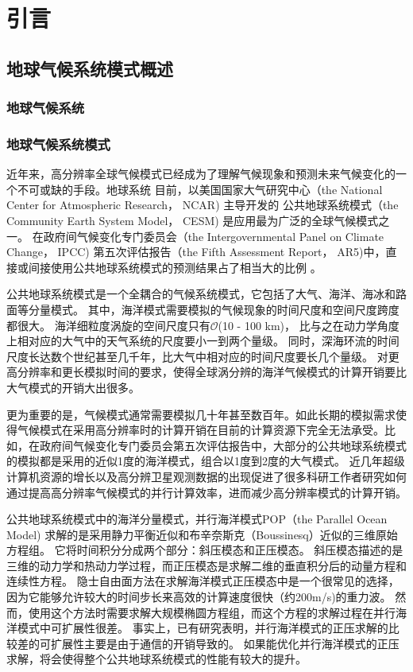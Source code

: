 \chapter{引言}
\label{cha:intro}

\section{地球气候系统模式概述}
\subsection{地球气候系统}
\subsection{地球气候系统模式}


近年来，高分辨率全球气候模式已经成为了理解气候现象和预测未来气候变化的一个不可或缺的手段。地球系统
目前，以美国国家大气研究中心（the National Center for Atmospheric Research， NCAR) 主导开发的
公共地球系统模式（the Community Earth System Model， CESM) 是应用最为广泛的全球气候模式之一。
在政府间气候变化专门委员会（the
Intergovernmental Panel on Climate Change， IPCC) 第五次评估报告（the Fifth Assessment
Report， AR5)中，直接或间接使用公共地球系统模式的预测结果占了相当大的比例 \cite{stocker2013ipcc}。
 

公共地球系统模式是一个全耦合的气候系统模式，它包括了大气、海洋、海冰和路面等分量模式。
其中，海洋模式需要模拟的气候现象的时间尺度和空间尺度跨度都很大。 
海洋细粒度涡旋的空间尺度只有$\mathcal{O}$(10 - 100 km)， 比与之在动力学角度上相对应的大气中的天气系统的尺度要小一到两个量级。
同时，深海环流的时间尺度长达数个世纪甚至几千年，比大气中相对应的时间尺度要长几个量级。
对更高分辨率和更长模拟时间的要求，使得全球涡分辨的海洋气候模式的计算开销要比大气模式的开销大出很多\cite{bryan2010frontal,mcclean2011prototype,graham2014importance}。


更为重要的是，气候模式通常需要模拟几十年甚至数百年。如此长期的模拟需求使得气候模式在采用高分辨率时的计算开销在目前的计算资源下完全无法承受。比如，在政府间气候变化专门委员会第五次评估报告中，大部分的公共地球系统模式的模拟都是采用的近似1度的海洋模式，组合以1度到2度的大气模式。
近几年超级计算机资源的增长以及高分辨卫星观测数据的出现促进了很多科研工作者研究如何通过提高高分辨率气候模式的并行计算效率，进而减少高分辨率模式的计算开销。


公共地球系统模式中的海洋分量模式，并行海洋模式POP（the Parallel Ocean Model) 求解的是采用静力平衡近似和布辛奈斯克（Boussinesq）近似的三维原始方程组。 
它将时间积分分成两个部分：斜压模态和正压模态。 
斜压模态描述的是三维的动力学和热动力学过程，而正压模态是求解二维的垂直积分后的动量方程和连续性方程。
隐士自由面方法在求解海洋模式正压模态中是一个很常见的选择，因为它能够允许较大的时间步长来高效的计算速度很快（约200m/s)的重力波。
然而，使用这个方法时需要求解大规模椭圆方程组，而这个方程的求解过程在并行海洋模式中可扩展性很差。
事实上，已有研究表明，并行海洋模式的正压求解的比较差的可扩展性主要是由于通信的开销导致的\cite{Worley:2011:PCE:2063384.2063457}。 
如果能优化并行海洋模式的正压求解，将会使得整个公共地球系统模式的性能有较大的提升\cite{dennis2012computational}。 

